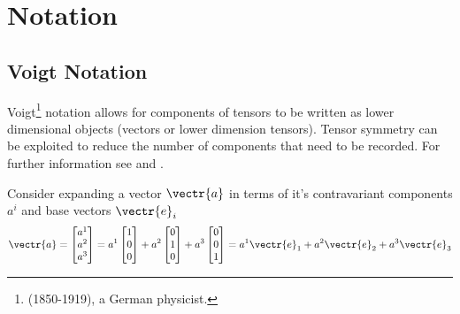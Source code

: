 \section{Notation}
\label{subsec:MathsNotation}

\subsection{Voigt Notation}
\label{subsec:MathsNotationVoigt}

Voigt\footnote{ (1850-1919), a German physicist.} notation allows for components of tensors to be
written as lower dimensional objects (vectors or lower dimension
tensors). Tensor symmetry \etc can be exploited to reduce the number
of components that need to be recorded. For further information see
\citet{helnwein:2001} and \citet{Brannon:2018}.

Consider expanding a vector $\vectr{a}$ in terms of it's contravariant
components $a^{i}$ and base vectors $\vectr{e}_{i}$ \ie
\begin{equation}
  \vectr{a}=\begin{bmatrix} a^{1} \\ a^{2} \\ a^{3} \end{bmatrix}
  =a^{1}\begin{bmatrix} 1 \\ 0 \\ 0 \end{bmatrix}
  +a^{2}\begin{bmatrix} 0 \\ 1 \\ 0 \end{bmatrix} 
  +a^{3}\begin{bmatrix} 0 \\ 0 \\ 1 \end{bmatrix}
  =a^{1}\vectr{e}_{1}+a^{2}\vectr{e}_{2}+a^{3}\vectr{e}_{3}
\end{equation}

